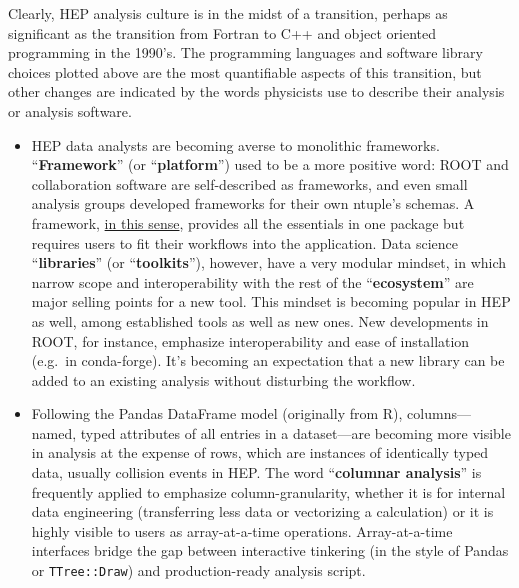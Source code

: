 \documentclass{article}
\begin{document}
Clearly, HEP analysis culture is in the midst of a transition, perhaps as significant as the transition from Fortran to C++ and object oriented programming in the 1990's. The programming languages and software library choices plotted above are the most quantifiable aspects of this transition, but other changes are indicated by the words physicists use to describe their analysis or analysis software.

\begin{itemize}
\item HEP data analysts are becoming averse to monolithic frameworks. ``{\bf Framework}'' (or ``{\bf platform}'') used to be a more positive word: ROOT and collaboration software are self-described as frameworks, and even small analysis groups developed frameworks for their own ntuple's schemas. A framework, \href{https://root.cern.ch/root/htmldoc/guides/users-guide/ROOTUsersGuide.html#the-framework}{in this sense}, provides all the essentials in one package but requires users to fit their workflows into the application. Data science ``{\bf libraries}'' (or ``{\bf toolkits}''), however, have a very modular mindset, in which narrow scope and interoperability with the rest of the ``{\bf ecosystem}'' are major selling points for a new tool. This mindset is becoming popular in HEP as well, among established tools as well as new ones. New developments in ROOT, for instance, emphasize interoperability and ease of installation (e.g.\ in conda-forge). It's becoming an expectation that a new library can be added to an existing analysis without disturbing the workflow.

\item Following the Pandas DataFrame model (originally from R), columns---named, typed attributes of all entries in a dataset---are becoming more visible in analysis at the expense of rows, which are instances of identically typed data, usually collision events in HEP. The word ``{\bf columnar analysis}'' is frequently applied to emphasize column-granularity, whether it is for internal data engineering (transferring less data or vectorizing a calculation) or it is highly visible to users as array-at-a-time operations. Array-at-a-time interfaces bridge the gap between interactive tinkering (in the style of Pandas or {\tt TTree::Draw}) and production-ready analysis script.


\end{itemize}
\end{document}
